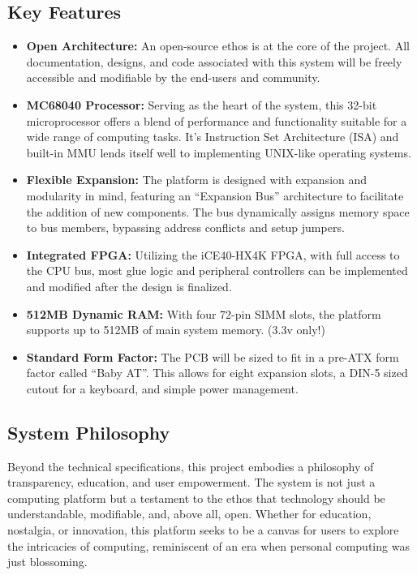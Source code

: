 \documentclass{article}
\begin{document}
\subsection{Key Features}
\begin{itemize}
	\item \textbf{Open Architecture:} An open-source ethos is at the core of the
	project. All documentation, designs, and code associated with this
	system will be freely accessible and modifiable by the end-users and
	community.

	\item \textbf{MC68040 Processor:} Serving as the heart of the system, this 32-bit
	microprocessor offers a blend of performance and functionality suitable
	for a wide range of computing tasks. It's Instruction Set Architecture
	(ISA) and built-in MMU lends itself well to implementing UNIX-like
	operating systems.

	\item \textbf{Flexible Expansion:} The platform is designed with expansion and
	modularity in mind, featuring an ``Expansion Bus'' architecture to
	facilitate the addition of new components. The bus dynamically assigns
	memory space to bus members, bypassing address conflicts and setup
	jumpers.

	\item \textbf{Integrated FPGA:} Utilizing the iCE40-HX4K FPGA, with full access
	to the CPU bus, most glue logic and peripheral controllers can be
	implemented and modified after the design is finalized.

	\item \textbf{512MB Dynamic RAM:} With four 72-pin SIMM slots, the platform
	supports up to 512MB of main system memory. (3.3v only!)

	\item \textbf{Standard Form Factor:} The PCB will be sized to fit in a pre-ATX
	form factor called ``Baby AT''. This allows for eight expansion slots,
	a DIN-5 sized cutout for a keyboard, and simple power management.
\end{itemize}

\subsection{System Philosophy}

Beyond the technical specifications, this project embodies a philosophy of
transparency, education, and user empowerment. The system is not just a
computing platform but a testament to the ethos that technology should be
understandable, modifiable, and, above all, open. Whether for education,
nostalgia, or innovation, this platform seeks to be a canvas for users to
explore the intricacies of computing, reminiscent of an era when personal
computing was just blossoming.
\end{document}
